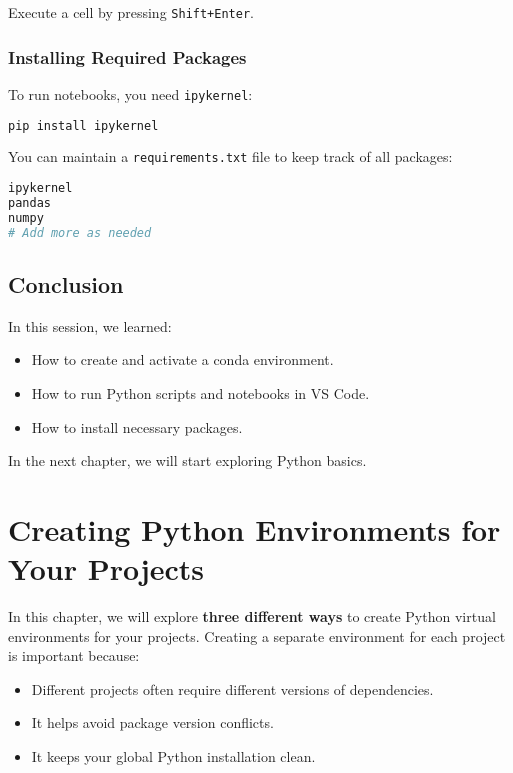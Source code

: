 \begin{noteBox}
Execute a cell by pressing \texttt{Shift+Enter}.
\end{noteBox}

\subsection{Installing Required Packages}
To run notebooks, you need \texttt{ipykernel}:
\begin{lstlisting}[language=bash]
pip install ipykernel
\end{lstlisting}

You can maintain a \texttt{requirements.txt} file to keep track of all packages:
\begin{lstlisting}[language=Python]
ipykernel
pandas
numpy
# Add more as needed
\end{lstlisting}

\section{Conclusion}
In this session, we learned:
\begin{itemize}
    \item How to create and activate a conda environment.
    \item How to run Python scripts and notebooks in VS Code.
    \item How to install necessary packages.
\end{itemize}

In the next chapter, we will start exploring Python basics.

\chapter{Creating Python Environments for Your Projects}

In this chapter, we will explore \textbf{three different ways} to create Python virtual environments for your projects.  
Creating a separate environment for each project is important because:
\begin{itemize}
    \item Different projects often require different versions of dependencies.
    \item It helps avoid package version conflicts.
    \item It keeps your global Python installation clean.
\end{itemize}

